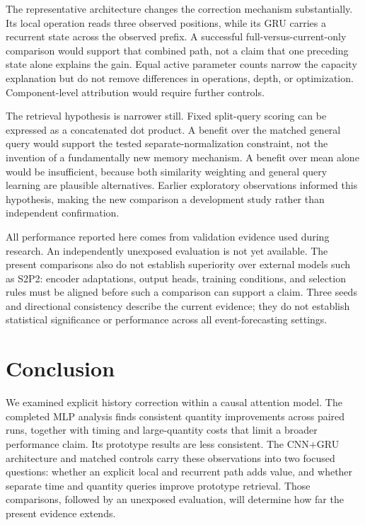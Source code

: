 \documentclass[runningheads]{llncs}
\begin{document}
The representative architecture changes the correction mechanism substantially. Its local operation reads three observed positions, while its GRU carries a recurrent state across the observed prefix. A successful full-versus-current-only comparison would support that combined path, not a claim that one preceding state alone explains the gain. Equal active parameter counts narrow the capacity explanation but do not remove differences in operations, depth, or optimization. Component-level attribution would require further controls.

The retrieval hypothesis is narrower still. Fixed split-query scoring can be expressed as a concatenated dot product. A benefit over the matched general query would support the tested separate-normalization constraint, not the invention of a fundamentally new memory mechanism. A benefit over mean alone would be insufficient, because both similarity weighting and general query learning are plausible alternatives. Earlier exploratory observations informed this hypothesis, making the new comparison a development study rather than independent confirmation.

All performance reported here comes from validation evidence used during research. An independently unexposed evaluation is not yet available. The present comparisons also do not establish superiority over external models such as S2P2: encoder adaptations, output heads, training conditions, and selection rules must be aligned before such a comparison can support a claim. Three seeds and directional consistency describe the current evidence; they do not establish statistical significance or performance across all event-forecasting settings.

\section{Conclusion}
We examined explicit history correction within a causal attention model. The completed MLP analysis finds consistent quantity improvements across paired runs, together with timing and large-quantity costs that limit a broader performance claim. Its prototype results are less consistent. The CNN+GRU architecture and matched controls carry these observations into two focused questions: whether an explicit local and recurrent path adds value, and whether separate time and quantity queries improve prototype retrieval. Those comparisons, followed by an unexposed evaluation, will determine how far the present evidence extends.
\end{document}
